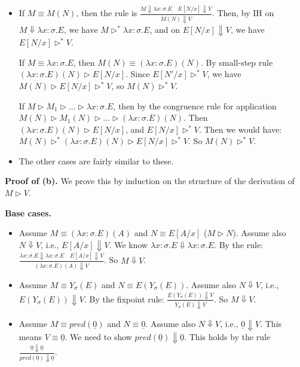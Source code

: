 \begin{solution}
\begin{itemize}
        \item If $M \equiv M(N)$, then the rule is $\frac{M \Downarrow \lambda x:\sigma.E \quad E[N/x] \Downarrow V}{M(N) \Downarrow V}$. Then, by IH on $M \Downarrow \lambda x:\sigma.E$,
              we have $M \rhd^* \lambda x:\sigma.E$, and on $E[N/x] \Downarrow V$, we have $E[N/x] \rhd^* V$.
              
              If $M \equiv \lambda x:\sigma.E$, then $M(N) \equiv (\lambda x:\sigma.E)(N)$. 
                By small-step rule $(\lambda x:\sigma.E)(N) \rhd E[N/x]$. Since $E[N'/x] \rhd^* V$, we have $M(N) \rhd E[N/x] \rhd^* V$, so $M(N) \rhd^* V$.
    

              If $M \rhd M_1 \rhd \dots \rhd \lambda x:\sigma.E$, then by the congruence rule for application $M(N) \rhd M_1(N) \rhd \dots \rhd (\lambda x:\sigma.E)(N)$.
                Then $(\lambda x:\sigma.E)(N) \rhd E[N/x]$, and $E[N/x] \rhd^* V$.
                Then we would have: $M(N) \rhd^* (\lambda x:\sigma.E)(N) \rhd E[N/x] \rhd^* V$. So $M(N) \rhd^* V$.
        
        \item The other cases are fairly similar to these. 
    \end{itemize}
    \textbf{Proof of (b).} We prove this by induction on the structure of the derivation of $M \rhd V$.

    \textbf{Base cases.}
    \begin{itemize}
        \item Assume $M \equiv (\lambda x:\sigma.E)(A)$ and $N \equiv E[A/x]$ ($M \rhd N$). Assume also $N \Downarrow V$, i.e., $E[A/x] \Downarrow V$.
              We know $\lambda x:\sigma.E \Downarrow \lambda x:\sigma.E$.
              By the rule: $\frac{\lambda x:\sigma.E \Downarrow \lambda x:\sigma.E \quad E[A/x] \Downarrow V}{(\lambda x:\sigma.E)(A) \Downarrow V}$. So $M \Downarrow V$.
    
        \item Assume $M \equiv Y_{\sigma}(E)$ and $N \equiv E(Y_{\sigma}(E))$.
              Assume also $N \Downarrow V$, i.e., $E(Y_{\sigma}(E)) \Downarrow V$.
              By the fixpoint rule: $\frac{E(Y_{\sigma}(E)) \Downarrow V}{Y_{\sigma}(E) \Downarrow V}$. So $M \Downarrow V$.

        \item Assume $M \equiv pred(\underline{0})$ and $N \equiv \underline{0}$.
              Assume also $N \Downarrow V$, i.e., $\underline{0} \Downarrow V$. This means $V \equiv \underline{0}$.
              We need to show $pred(\underline{0}) \Downarrow \underline{0}$. This holds by the rule $\frac{\underline{0} \Downarrow \underline{0}}{pred(\underline{0}) \Downarrow \underline{0}}$.


\end{itemize}
\end{solution}
